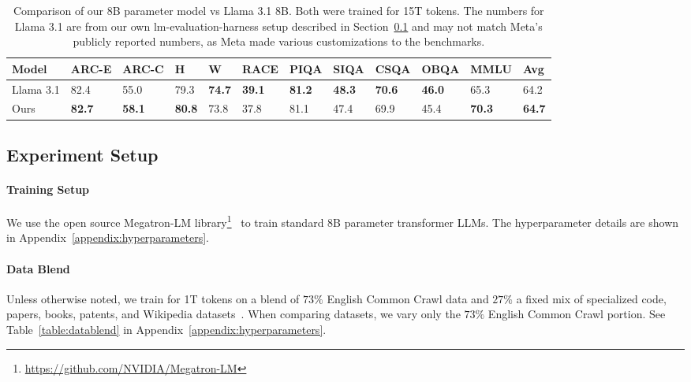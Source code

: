 \documentclass[11pt]{article}
\begin{document}
\begin{table}[!hbt]\small\centering
\begin{tabularx}{\textwidth}{Xlllllllllll}
\toprule
\textbf{Model}        & \textbf{ARC-E} & \textbf{ARC-C} & \textbf{H}    & \textbf{W}    & \textbf{RACE} & \textbf{PIQA} & \textbf{SIQA} & \textbf{CSQA} & \textbf{OBQA} & \textbf{MMLU} & \textbf{Avg}       \\ \midrule
Llama 3.1 & 82.4          & 55.0          & 79.3          & \textbf{74.7} & \textbf{39.1} & \textbf{81.2} & \textbf{48.3} & \textbf{70.6} & \textbf{46.0} & 65.3          & 64.2          \\
Ours       & \textbf{82.7} & \textbf{58.1} & \textbf{80.8} & 73.8          & 37.8          & 81.1          & 47.4          & 69.9          & 45.4          & \textbf{70.3} & \textbf{64.7} \\ \bottomrule
\end{tabularx}
\caption{Comparison of our 8B parameter model vs Llama 3.1 8B. Both were trained for 15T tokens. The numbers for Llama 3.1 are from our own lm-evaluation-harness setup described in Section~\ref{section:experiment-setup} and may not match Meta's publicly reported numbers, as Meta made various customizations to the benchmarks.}
\label{table:8b-15t}
\end{table}


\subsection{Experiment Setup}
\label{section:experiment-setup}

\paragraph{Training Setup} We use the open source Megatron-LM library\footnote{\url{https://github.com/NVIDIA/Megatron-LM}}~\citep{shoeybi2019megatron} to train standard 8B parameter transformer LLMs. The hyperparameter details are shown in Appendix~\ref{appendix:hyperparameters}.

\paragraph{Data Blend} Unless otherwise noted, we train for 1T tokens on a blend of $73\%$ English Common Crawl data and $27\%$ a fixed mix of specialized code, papers, books, patents, and Wikipedia datasets~\citep{adler2024nemotron}. When comparing datasets, we vary only the $73\%$ English Common Crawl portion. See Table~\ref{table:datablend} in Appendix~\ref{appendix:hyperparameters}.
\end{document}
